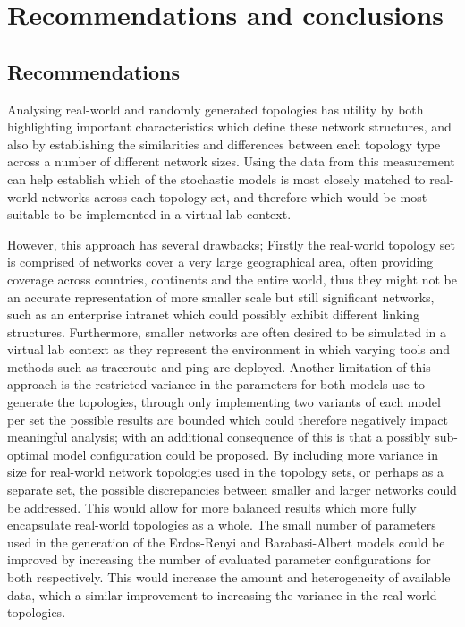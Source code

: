 \section{Recommendations and conclusions}

\subsection{Recommendations}
Analysing real-world and randomly generated topologies has utility by both highlighting important characteristics which define these network structures, and also by establishing the similarities and differences between each topology type across a number of different network sizes. Using the data from this measurement can help establish which of the stochastic models is most closely matched to real-world networks across each topology set, and therefore which would be most suitable to be implemented in a virtual lab context. 

However, this approach has several drawbacks; Firstly the real-world topology set is comprised of networks cover a very large geographical area, often providing coverage across countries, continents and the entire world, thus they might not be an accurate representation of more smaller scale but still significant networks, such as an enterprise intranet which could possibly exhibit different linking structures. Furthermore, smaller networks are often desired to be simulated in a virtual lab context as they represent the environment in which varying tools and methods such as traceroute \cite{jacobson1989traceroute} and ping are deployed. Another limitation of this approach is the restricted variance in the parameters for both models use to generate the topologies, through only implementing two variants of each model per set the possible results are bounded which could therefore negatively impact meaningful analysis; with an additional consequence of this is that a possibly sub-optimal model configuration could be proposed. By including more variance in size for real-world network topologies used in the topology sets, or perhaps as a separate set, the possible discrepancies between smaller and larger networks could be addressed. This would allow for more balanced results which more fully encapsulate real-world topologies as a whole. The small number of parameters used in the generation of the Erdos-Renyi and Barabasi-Albert models could be improved by increasing the number of evaluated parameter configurations for both respectively. This would increase the amount and heterogeneity of available data, which a similar improvement to increasing the variance in the real-world topologies. 

